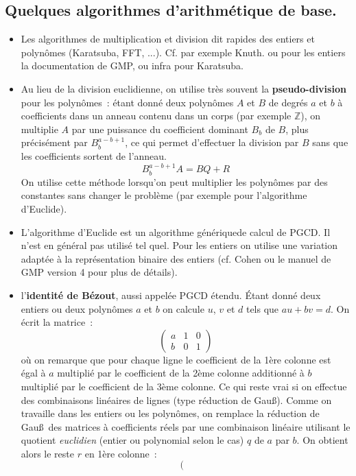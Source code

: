 \documentclass[a4paper,11pt]{book}
\begin{document}
\begin{giacjshere}
\section{Quelques algorithmes d'arithmétique de base.}
\begin{itemize}
\item Les algorithmes de multiplication et division dit rapides
des entiers et polyn\^omes (Karatsuba, FFT, ...). Cf. par exemple Knuth.
ou pour les entiers la documentation de GMP, ou infra pour Karatsuba.
\item Au lieu de la division euclidienne, on utilise très souvent la
{\bf pseudo-division} pour les polynômes~: étant donné deux polyn\^omes $A$
et $B$ de degrés $a$ et $b$ à coefficients dans un anneau contenu dans un corps
(par exemple $\mathbb{Z}$), on multiplie $A$ par une puissance du coefficient
dominant $B_b$ de $B$, plus précisément par $B_b^{a-b+1}$, ce qui permet 
d'effectuer la division par $B$ sans que
les coefficients sortent de l'anneau.
\[ B_b^{a-b+1} A= B Q + R \]
On utilise cette méthode lorsqu'on peut multiplier les polyn\^omes par
des constantes sans changer le problème (par exemple pour l'algorithme
d'Euclide).
\item L'algorithme d'Euclide est un algorithme \og générique\fg de calcul
de PGCD. Il n'est en général pas utilisé tel quel. Pour les entiers 
on utilise une variation adaptée à la
représentation binaire des entiers (cf. Cohen ou le manuel de GMP version 4 
pour plus de détails). 
\item l'{\bf identité de Bézout}, aussi appelée PGCD étendu. \'Etant donné
deux entiers ou deux polyn\^omes $a$ et $b$ on calcule $u$, $v$ et
$d$ tels que $au+bv=d$. On écrit la matrice~:
\[ \left( \begin{array}{lll}
a & 1 & 0 \\
b & 0 & 1
\end{array} \right) \]
où on remarque que pour chaque ligne le coefficient de la 1ère colonne 
est égal à $a$ multiplié par le coefficient de la
2ème colonne additionné à $b$ multiplié par le coefficient de la 
3ème colonne. Ce qui reste vrai si on effectue des
combinaisons linéaires de lignes (type réduction de Gau\ss). 
Comme on travaille dans les entiers ou les polyn\^omes, on remplace la
réduction de Gau\ss\ des matrices à coefficients réels par une combinaison 
linéaire utilisant le quotient {\em euclidien\/} (entier ou polynomial
selon le cas) $q$
de $a$ par $b$. On obtient alors le reste $r$ en 1ère colonne~:
\[  \left( \begin{array}{rlll}

\end{array}\]
\end{itemize}
\end{giacjshere}
\end{document}
